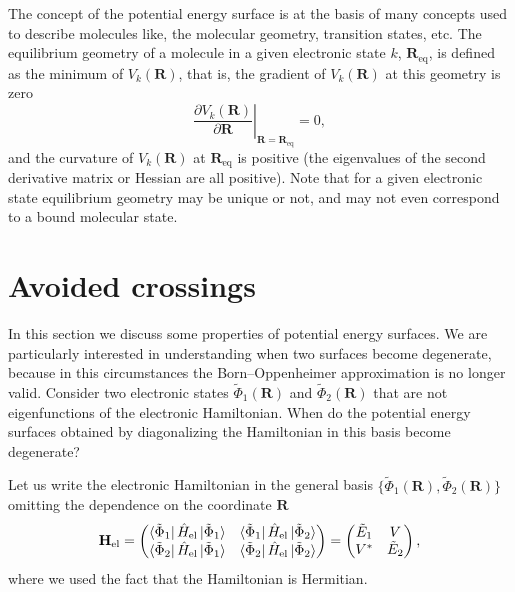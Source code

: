 \documentclass[../Main/chem532-notes.tex]{subfiles}
\begin{document}
The concept of the potential energy surface is at the basis of many concepts used to describe molecules like, the molecular geometry, transition states, etc.
The equilibrium geometry of a molecule in a given electronic state $k$, $\mathbf{R}_\mathrm{eq}$, is defined as the minimum of $V_{k}(\mathbf{R})$, that is, the gradient of $V_{k}(\mathbf{R})$ at this geometry is zero
\begin{equation}
\left. \frac{\partial V_{k}(\mathbf{R})}{\partial \mathbf{R}} \right|_{\mathbf{R}= \mathbf{R}_\mathrm{eq}}= 0,
\end{equation}
and the curvature of $V_{k}(\mathbf{R})$ at $\mathbf{R}_\mathrm{eq}$ is positive (the eigenvalues of the second derivative matrix or Hessian are all positive).
Note that for a given electronic state equilibrium geometry may be unique or not, and may not even correspond to a bound molecular state.




\section{Avoided crossings}
In this section we discuss some properties of potential energy surfaces. We are particularly interested in understanding when two surfaces become degenerate, because in this circumstances the Born--Oppenheimer approximation is no longer valid.
Consider two electronic states $\tilde{\Phi}_1(\mathbf{R})$ and $\tilde{\Phi}_2(\mathbf{R})$ that are not eigenfunctions of the electronic Hamiltonian. When do the potential energy surfaces obtained by diagonalizing the Hamiltonian in this basis become degenerate? 

Let us write the electronic Hamiltonian in the general basis $\{\tilde{\Phi}_1(\mathbf{R}),\tilde{\Phi}_2(\mathbf{R})\}$ omitting the dependence on the coordinate $\mathbf{R}$
\begin{equation}
\mathbf{H}_\mathrm{el} = 
\begin{pmatrix}
\bra{\tilde{\Phi}_1} \hat{H}_\mathrm{el} \ket{\tilde{\Phi}_1} & \bra{\tilde{\Phi}_1} \hat{H}_\mathrm{el} \ket{\tilde{\Phi}_2}\\
\bra{\tilde{\Phi}_2} \hat{H}_\mathrm{el} \ket{\tilde{\Phi}_1} & \bra{\tilde{\Phi}_2} \hat{H}_\mathrm{el} \ket{\tilde{\Phi}_2}
\end{pmatrix}
=
\begin{pmatrix}
\tilde{E}_{1} & V \\
V^* & \tilde{E}_{2}
\end{pmatrix},
\end{equation}
where we used the fact that the Hamiltonian is Hermitian.
\end{document}

